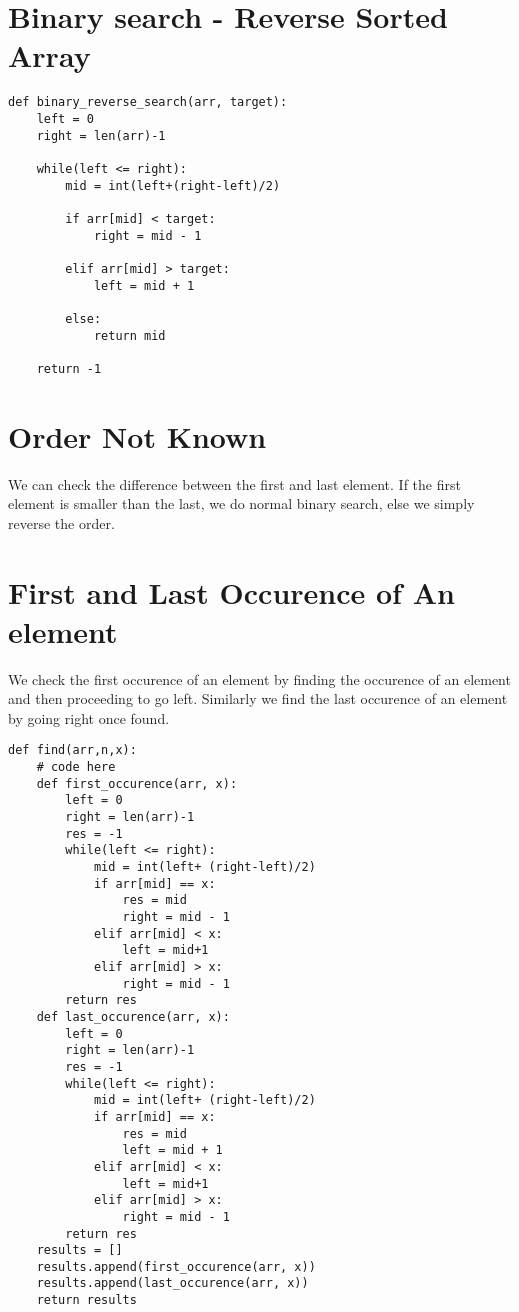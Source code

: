 \documentclass[24pt, a4]{article}
\begin{document}
\section{Binary search - Reverse Sorted Array}

\begin{lstlisting}
def binary_reverse_search(arr, target):
    left = 0
    right = len(arr)-1

    while(left <= right):
        mid = int(left+(right-left)/2)

        if arr[mid] < target:
            right = mid - 1

        elif arr[mid] > target:
            left = mid + 1

        else:
            return mid

    return -1
\end{lstlisting}
\newpage

\section{Order Not Known}

We can check the difference between the first and last element. If the first 
element is smaller than the last, we do normal binary search, else we simply 
reverse the order.

\section{First and Last Occurence of An element}

We check the first occurence of an element by finding the occurence of an
element and then proceeding to go left.
Similarly we find the last occurence of an element by going right once found.

\begin{lstlisting}
def find(arr,n,x):
    # code here
    def first_occurence(arr, x):
        left = 0
        right = len(arr)-1
        res = -1
        while(left <= right):
            mid = int(left+ (right-left)/2)
            if arr[mid] == x:
                res = mid
                right = mid - 1
            elif arr[mid] < x:
                left = mid+1
            elif arr[mid] > x:
                right = mid - 1
        return res
    def last_occurence(arr, x):
        left = 0
        right = len(arr)-1
        res = -1
        while(left <= right):
            mid = int(left+ (right-left)/2)
            if arr[mid] == x:
                res = mid
                left = mid + 1
            elif arr[mid] < x:
                left = mid+1
            elif arr[mid] > x:
                right = mid - 1
        return res
    results = []
    results.append(first_occurence(arr, x))
    results.append(last_occurence(arr, x))
    return results
\end{lstlisting}
\newpage
\end{document}
